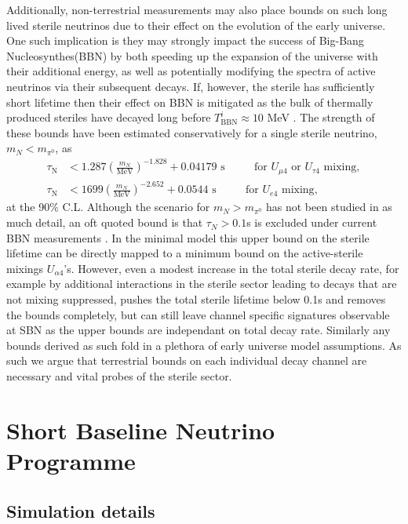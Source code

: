 \documentclass[11pt, a4paper]{article}
\begin{document}
Additionally, non-terrestrial measurements may also place bounds on such long lived sterile neutrinos due to their effect on the evolution of the early universe. One such implication is they may strongly impact the success of Big-Bang Nucleosynthes(BBN) by both speeding up the expansion of the universe with their additional energy, as well as potentially modifying the spectra of active neutrinos via their subsequent decays. If, however, the sterile has sufficiently short lifetime  then their effect on BBN is mitigated as the bulk of thermally produced steriles have decayed long before $T^i_\text{BBN} \approx 10$ MeV \cite{Fields:2006ga}. The strength of these bounds have been estimated conservatively for a single sterile neutrino, $m_N < m_{\pi^0}$, as \cite{Dolgov:2000jw,Dolgov:2000pj}
\begin{align*}
	\tau_\text{N} &< 1.287 \left( \frac{m_N}{\text{MeV}}\right)^{-1.828}+0.04179 \text{  s    $\qquad$  for $U_{\mu 4}$ or $U_{\tau 4}$ mixing},\\
	\tau_\text{N} &< 1699 \left( \frac{m_N}{\text{MeV}}\right)^{-2.652}+0.0544 \text{  s    $\qquad$  for $U_{e 4}$ mixing},
\end{align*}
at the 90\% C.L. Although the scenario for $m_N > m_{\pi^0}$ has not been studied in as much detail, an oft quoted bound is that $\tau_N > 0.1$s is excluded under current BBN measurements \cite{Dolgov:2000j}. In the minimal model this upper bound on the sterile lifetime can be directly mapped to a minimum bound on the active-sterile mixings $U_{\alpha 4}$'s. However, even a modest increase in the total sterile decay rate, for example by additional interactions in the sterile sector leading to decays that are not mixing suppressed, pushes the total sterile lifetime below 0.1s and removes the bounds completely, but can still leave channel specific signatures observable at SBN as the upper bounds are independant on total decay rate. Similarly any bounds derived as such fold in a plethora of early universe model assumptions. As such we argue that terrestrial bounds on each individual decay channel are necessary and vital probes of the sterile sector. \\

\section{\label{sec:simulation}Short Baseline Neutrino Programme}

\subsection{Simulation details}
\end{document}
